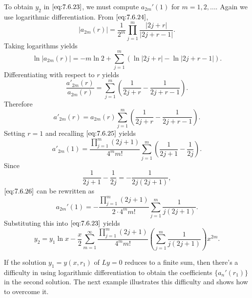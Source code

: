\documentclass{ximera}
\begin{document}
\begin{example}
\begin{explanation}
To obtain $y_2$ in $\eqref{eq:7.6.23}$, we must compute $a_{2m}'(1)$
for $m=1, 2, \dots$. Again we use logarithmic differentiation. From
$\eqref{eq:7.6.24}$,
$$
|a_{2m}(r)|=\frac{1}{2^m}\prod_{j=1}^m\frac{|2j+r|}{|2j+r-1|}.
$$
Taking logarithms yields
$$
\ln |a_{2m}(r)|=-m\ln2+ \sum^m_{j=1} \left(\ln
|2j+r|-\ln|2j+r-1|\right).
$$
Differentiating with respect to $r$ yields
$$
\frac{a'_{2m}(r)}{a_{2m}(r)}=\sum^m_{j=1} \left(\frac{1}{2j+r}-\frac{1}{2j+r-1}\right).
$$
Therefore
$$
a'_{2m}(r)=a_{2m}(r) \sum^m_{j=1} \left(\frac{1}{2j+r}-\frac{1}{2j+r-1}\right).
$$
Setting $r=1$  and recalling $\eqref{eq:7.6.25}$ yields
\begin{equation} \label{eq:7.6.26}
a'_{2m}(1)=\frac{\prod_{j=1}^m(2j+1)}{4^mm!}
\sum_{j=1}^m\left(\frac{1}{2j+1}-\frac{1}{2j}\right).
\end{equation}
Since
$$
\frac{1}{2j+1}-\frac{1}{2j}=-\frac{1}{2j(2j+1)},
$$
$\eqref{eq:7.6.26}$ can be rewritten as
$$
a_{2m}'(1)=-\frac{\prod_{j=1}^m(2j+1)}{2\cdot4^mm!}
\sum_{j=1}^m\frac{1}{j(2j+1)}.
$$
Substituting this into $\eqref{eq:7.6.23}$ yields
$$
y_2=y_1\ln
x-\frac{x}{2}\sum_{m=1}^\infty\frac{\prod_{j=1}^m(2j+1)}{4^mm!}
\left(\sum_{j=1}^m\frac{1}{j(2j+1)}\right)x^{2m}.
$$
\end{explanation}
\end{example}

If the solution $y_1=y(x,r_1)$ of $Ly=0$ reduces to a finite sum, then
there's a
difficulty in using logarithmic differentiation to obtain the coefficients
$\{a_n'(r_1)\}$ in the second solution. The next example illustrates
this difficulty and shows how to overcome it.
\end{document}

